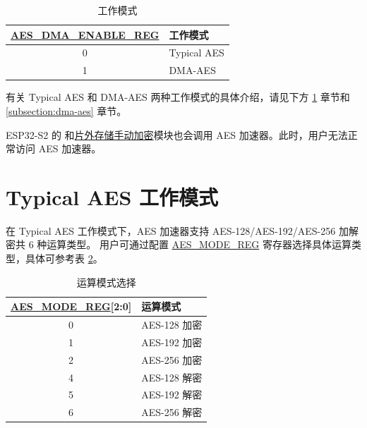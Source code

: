 \documentclass[main\_\_CN.tex]{subfiles}
\begin{document}
\begin{longtable}[c]{ |c|l| }
\caption{工作模式}
\label{table:AES_DMA_ENABLE}
\\\hline
\rowcolor{lightgray}
\hyperref[regdesc:AESDMAENABLEREG]{AES\_DMA\_ENABLE\_REG}       & 工作模式\\
    \hline
    0           & Typical AES    \\
    \hline
    1           & DMA-AES        \\
    \hline
\end{longtable}

有关 Typical AES 和 DMA-AES 两种工作模式的具体介绍，请见下方 \ref{subsection:typicalaes} 章节和 \ref{subsection:dma-aes} 章节。

\begin{importantlisting}
\vspace{-0.5em}

    ESP32-S2 的  和\hyperref[mod:extmemencr]{片外存储手动加密}模块也会调用 AES 加速器。此时，用户无法正常访问 AES 加速器。
\end{importantlisting}

\section{Typical AES 工作模式}\label{subsection:typicalaes}

在 Typical AES 工作模式下，AES 加速器支持 AES-128/AES-192/AES-256 加解密共 6 种运算类型。
用户可通过配置 \hyperref[regdesc:AESMODEREG]{AES\_MODE\_REG} 寄存器选择具体运算类型，具体可参考表 \ref{table:AESOperation}。

\begin{longtable}[c]{ | c | l | }
\caption{运算模式选择}
\label{table:AESOperation}
\\\hline
\rowcolor{lightgray}
\hyperref[regdesc:AESMODEREG]{AES\_MODE\_REG}[2:0]     & 运算模式\\
    \hline
    0                   & AES-128 加密    \\
    \hline
    1                   & AES-192 加密    \\
    \hline
    2                   & AES-256 加密    \\
    \hline
    4                   & AES-128 解密    \\
    \hline
    5                   & AES-192 解密    \\
    \hline
    6                   & AES-256 解密    \\
    \hline
\end{longtable}
\end{document}
